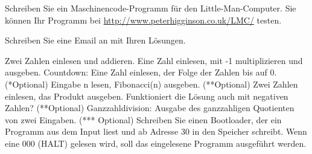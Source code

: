 \begin{question}
    Schreiben Sie ein Maschinencode-Programm für den Little-Man-Computer. Sie können Ihr Programm bei \url{http://www.peterhigginson.co.uk/LMC/} testen.

    Schreiben Sie eine Email an \mail{} mit Ihren Lösungen.
    \begin{tasks}
        \task Zwei Zahlen einlesen und addieren. 
        \task Eine Zahl einlesen, mit -1 multiplizieren und ausgeben.
		\task Countdown: Eine Zahl einlesen, der Folge der Zahlen bis auf 0.
		\task (*Optional) Eingabe n lesen, Fibonacci(n) ausgeben.
        \task (**Optional) Zwei Zahlen einlesen, das Produkt ausgeben. Funktioniert die Lösung auch mit negativen Zahlen?
		\task (**Optional) Ganzzahldivision: Ausgabe des ganzzahligen Quotienten von zwei Eingaben.
		\task (*** Optional) Schreiben Sie einen Bootloader, der ein Programm aus dem Input liest und ab Adresse 30 in den Speicher schreibt. Wenn eine 000 (HALT) gelesen wird, soll das eingelesene Programm ausgeführt werden.
    \end{tasks}
\end{question}
